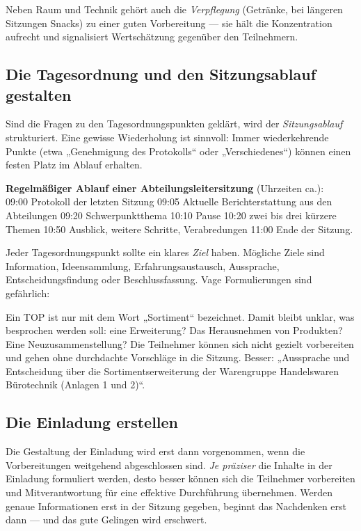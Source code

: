 \documentclass[11pt, a4paper]{article}
\begin{document}
\medskip
Neben Raum und Technik gehört auch die \emph{Verpflegung} (Getränke, bei längeren Sitzungen
Snacks) zu einer guten Vorbereitung --- sie hält die Konzentration aufrecht und signalisiert
Wertschätzung gegenüber den Teilnehmern.

\subsection{Die Tagesordnung und den Sitzungsablauf gestalten}

Sind die Fragen zu den Tagesordnungspunkten geklärt, wird der \emph{Sitzungsablauf}
strukturiert. Eine gewisse Wiederholung ist sinnvoll: Immer wiederkehrende Punkte (etwa
„Genehmigung des Protokolls“ oder „Verschiedenes“) können einen festen Platz im Ablauf
erhalten.

\begin{beispiel}
\textbf{Regelmäßiger Ablauf einer Abteilungsleitersitzung} (Uhrzeiten ca.):\\[0.3em]
09:00 Protokoll der letzten Sitzung \textbar{} 09:05 Aktuelle Berichterstattung aus den
Abteilungen \textbar{} 09:20 Schwerpunktthema \textbar{} 10:10 Pause \textbar{} 10:20 zwei
bis drei kürzere Themen \textbar{} 10:50 Ausblick, weitere Schritte, Verabredungen \textbar{}
11:00 Ende der Sitzung.
\end{beispiel}

Jeder Tagesordnungspunkt sollte ein klares \emph{Ziel} haben. Mögliche Ziele sind
Information, Ideensammlung, Erfahrungsaustausch, Aussprache, Entscheidungsfindung oder
Beschlussfassung. Vage Formulierungen sind gefährlich:

\begin{beispiel}
Ein TOP ist nur mit dem Wort „Sortiment“ bezeichnet. Damit bleibt unklar, was besprochen
werden soll: eine Erweiterung? Das Herausnehmen von Produkten? Eine Neuzusammenstellung? Die
Teilnehmer können sich nicht gezielt vorbereiten und gehen ohne durchdachte Vorschläge in die
Sitzung. Besser: „Aussprache und Entscheidung über die Sortimentserweiterung der Warengruppe
Handelswaren Bürotechnik (Anlagen 1 und 2)“.
\end{beispiel}

\subsection{Die Einladung erstellen}

Die Gestaltung der Einladung wird erst dann vorgenommen, wenn die Vorbereitungen weitgehend
abgeschlossen sind. \emph{Je präziser} die Inhalte in der Einladung formuliert werden, desto
besser können sich die Teilnehmer vorbereiten und Mitverantwortung für eine effektive
Durchführung übernehmen. Werden genaue Informationen erst in der Sitzung gegeben, beginnt das
Nachdenken erst dann --- und das gute Gelingen wird erschwert.
\end{document}
